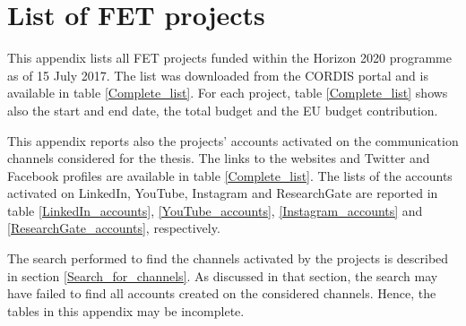\chapter{List of FET projects} \label{List_of_FET_projects}
This appendix lists all FET projects funded within the Horizon 2020 programme as of 15 July 2017. The list was downloaded from the CORDIS portal \cite{CORDIS} and is available in table \ref{Complete_list}. For each project, table \ref{Complete_list} shows also the start and end date, the total budget and the EU budget contribution.  

This appendix reports also the projects' accounts activated on the communication channels considered for the thesis. The links to the websites and Twitter and Facebook profiles are available in table \ref{Complete_list}. The lists of the accounts activated on LinkedIn, YouTube, Instagram and ResearchGate are reported in table \ref{LinkedIn_accounts}, \ref{YouTube_accounts}, \ref{Instagram_accounts} and \ref{ResearchGate_accounts}, respectively.

The search performed to find the channels activated by the projects is described in section \ref{Search_for_channels}. As discussed in that section, the search may have failed to find all accounts created on the considered channels. Hence, the tables in this appendix may be incomplete.

